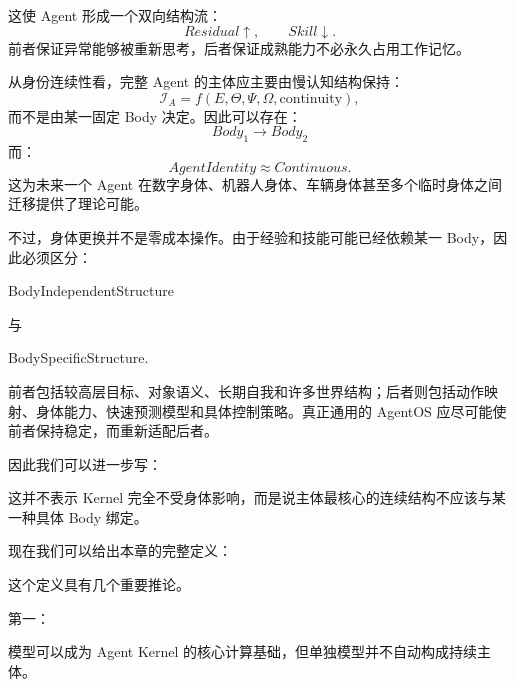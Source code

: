 这使 Agent 形成一个双向结构流：
\[
Residual\uparrow,
\qquad
Skill\downarrow.
\]
前者保证异常能够被重新思考，后者保证成熟能力不必永久占用工作记忆。

从身份连续性看，完整 Agent 的主体应主要由慢认知结构保持：
\[
\mathcal I_A
=
f(
E,\Theta,\Psi,\Omega,\text{continuity}
),
\]
而不是由某一固定 Body 决定。因此可以存在：
\[
Body_1
\rightarrow
Body_2
\]
而：
\[
AgentIdentity
\approx
Continuous.
\]
这为未来一个 Agent 在数字身体、机器人身体、车辆身体甚至多个临时身体之间迁移提供了理论可能。

不过，身体更换并不是零成本操作。由于经验和技能可能已经依赖某一 Body，因此必须区分：
\begin{statementbox}
BodyIndependentStructure
\end{statementbox}
与
\begin{statementbox}
BodySpecificStructure.
\end{statementbox}
前者包括较高层目标、对象语义、长期自我和许多世界结构；后者则包括动作映射、身体能力、快速预测模型和具体控制策略。真正通用的 AgentOS 应尽可能使前者保持稳定，而重新适配后者。

因此我们可以进一步写：
\begin{statementbox}
\centering
{}
\end{statementbox}
这并不表示 Kernel 完全不受身体影响，而是说主体最核心的连续结构不应该与某一种具体 Body 绑定。

现在我们可以给出本章的完整定义：

\begin{statementbox}
\centering
{}
\end{statementbox}

这个定义具有几个重要推论。

第一：
\begin{statementbox}
\centering
{}
\end{statementbox}
模型可以成为 Agent Kernel 的核心计算基础，但单独模型并不自动构成持续主体。

